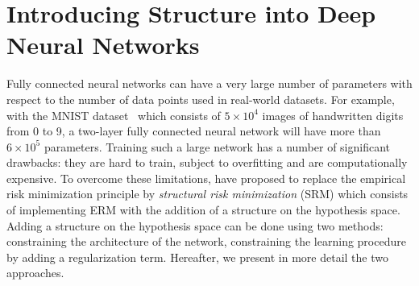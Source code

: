 


\section{Introducing Structure into Deep Neural Networks}
\label{section:ch1-introducting_structure_into_deep_neural_networks}


Fully connected neural networks can have a very large number of parameters with respect to the number of data points used in real-world datasets.
For example, with the MNIST dataset~\cite{lecun1998gradient} which consists of $5 \times 10^4$ images of handwritten digits from 0 to 9, a two-layer fully connected neural network will have more than $6 \times 10^5$ parameters.
Training such a large network has a number of significant drawbacks: they are hard to train, subject to overfitting and are computationally expensive.
To overcome these limitations, \citet{vapnik1992principles} have proposed to replace the empirical risk minimization principle by \emph{structural risk minimization} (SRM) which consists of implementing ERM with the addition of a structure on the hypothesis space.
Adding a structure on the hypothesis space can be done using two methods: constraining the architecture of the network, constraining the learning procedure by adding a regularization term. 
Hereafter, we present in more detail the two approaches.  




